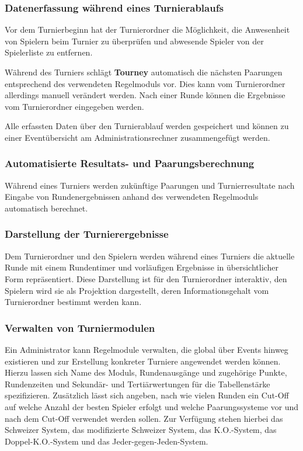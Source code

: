\documentclass[11pt]{article}
\begin{document}
\subsubsection{Datenerfassung während eines Turnierablaufs}

Vor dem Turnierbeginn hat der Turnierordner die Möglichkeit, die Anwesenheit von Spielern beim Turnier zu überprüfen und abwesende Spieler von der Spielerliste zu entfernen.

Während des Turniers schlägt \textbf{Tourney} automatisch die nächsten Paarungen entsprechend des verwendeten Regelmoduls vor. Dies kann vom Turnierordner allerdings manuell verändert werden. Nach einer Runde können die Ergebnisse vom Turnierordner eingegeben werden.

Alle erfassten Daten über den Turnierablauf werden gespeichert und können zu einer Eventübersicht am Administrationsrechner zusammengefügt werden.

\subsubsection{Automatisierte Resultats- und Paarungsberechnung}

Während eines Turniers werden zukünftige Paarungen und Turnierresultate nach Eingabe von Rundenergebnissen anhand des verwendeten Regelmoduls automatisch berechnet.

\subsubsection{Darstellung der Turnierergebnisse}

Dem Turnierordner und den Spielern werden während eines Turniers die aktuelle Runde mit einem Rundentimer und vorläufigen Ergebnisse in übersichtlicher Form repräsentiert. Diese Darstellung ist für den Turnierordner interaktiv, den Spielern wird sie als Projektion dargestellt, deren Informationsgehalt vom Turnierordner bestimmt werden kann.

\newpage

\subsubsection{Verwalten von Turniermodulen}

Ein Administrator kann Regelmodule verwalten, die global über Events hinweg existieren und zur Erstellung konkreter Turniere angewendet werden können. Hierzu lassen sich Name des Moduls, Rundenausgänge und zugehörige Punkte, Rundenzeiten und Sekundär- und Tertiärwertungen für die Tabellenstärke spezifizieren. Zusätzlich lässt sich angeben, nach wie vielen Runden ein Cut-Off auf welche Anzahl der besten Spieler erfolgt und welche Paarungssysteme vor und nach dem Cut-Off verwendet werden sollen. Zur Verfügung stehen hierbei das Schweizer System, das modifizierte Schweizer System, das K.O.-System, das Doppel-K.O.-System und das Jeder-gegen-Jeden-System.
\end{document}
